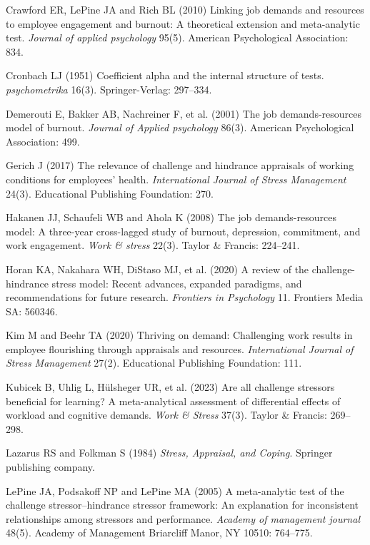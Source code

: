 \documentclass[
  man]{apa7}
\newlength{\cslhangindent}
\newenvironment{CSLReferences}[2] %
 {\begin{list}{}{%
  \setlength{\itemindent}{0pt}
  \setlength{\leftmargin}{0pt}
  \setlength{\parsep}{0pt}
  \ifodd #1
   \setlength{\leftmargin}{\cslhangindent}
   \setlength{\itemindent}{-1\cslhangindent}
  \fi
  \setlength{\itemsep}{#2\baselineskip}}}
 {\end{list}}
\begin{document}
\begin{CSLReferences}{1}{1}
Crawford ER, LePine JA and Rich BL (2010) Linking job demands and resources to employee engagement and burnout: A theoretical extension and meta-analytic test. \emph{Journal of applied psychology} 95(5). American Psychological Association: 834.

Cronbach LJ (1951) Coefficient alpha and the internal structure of tests. \emph{psychometrika} 16(3). Springer-Verlag: 297--334.

Demerouti E, Bakker AB, Nachreiner F, et al. (2001) The job demands-resources model of burnout. \emph{Journal of Applied psychology} 86(3). American Psychological Association: 499.

Gerich J (2017) The relevance of challenge and hindrance appraisals of working conditions for employees' health. \emph{International Journal of Stress Management} 24(3). Educational Publishing Foundation: 270.

Hakanen JJ, Schaufeli WB and Ahola K (2008) The job demands-resources model: A three-year cross-lagged study of burnout, depression, commitment, and work engagement. \emph{Work \& stress} 22(3). Taylor \& Francis: 224--241.

Horan KA, Nakahara WH, DiStaso MJ, et al. (2020) A review of the challenge-hindrance stress model: Recent advances, expanded paradigms, and recommendations for future research. \emph{Frontiers in Psychology} 11. Frontiers Media SA: 560346.

Kim M and Beehr TA (2020) Thriving on demand: Challenging work results in employee flourishing through appraisals and resources. \emph{International Journal of Stress Management} 27(2). Educational Publishing Foundation: 111.

Kubicek B, Uhlig L, Hülsheger UR, et al. (2023) Are all challenge stressors beneficial for learning? A meta-analytical assessment of differential effects of workload and cognitive demands. \emph{Work \& Stress} 37(3). Taylor \& Francis: 269--298.

Lazarus RS and Folkman S (1984) \emph{Stress, Appraisal, and Coping}. Springer publishing company.

LePine JA, Podsakoff NP and LePine MA (2005) A meta-analytic test of the challenge stressor--hindrance stressor framework: An explanation for inconsistent relationships among stressors and performance. \emph{Academy of management journal} 48(5). Academy of Management Briarcliff Manor, NY 10510: 764--775.


\end{CSLReferences}
\end{document}
